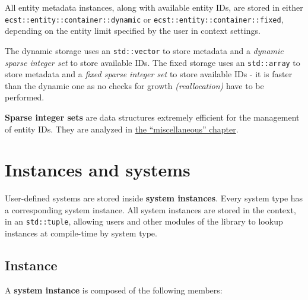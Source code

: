 \documentclass[twoside, 12pt, a4paper, openany]{book}
\begin{document}
All entity metadata instances, along with available entity IDs, are
stored in either
\texttt{ecst::entity::container::dynamic}
or
\texttt{ecst::entity::container::fixed},
depending on the entity limit specified by the user in context settings.

The dynamic storage uses an
\texttt{std::vector}
to store metadata and a \emph{dynamic sparse integer set} to store
available IDs. The fixed storage uses an
\texttt{std::array}
to store metadata and a \emph{fixed sparse integer set} to store
available IDs - it is faster than the dynamic one as no checks for
growth \emph{(reallocation)} have to be performed.

\textbf{Sparse integer sets} are data structures extremely efficient for
the management of entity IDs. They are analyzed in
\protect\hyperlink{appendix_sparse_integer_sets}{the ``miscellaneous''
chapter}.

\hypertarget{storage_system}{\section{Instances and
systems}\label{storage_system}}

User-defined systems are stored inside \textbf{system instances}. Every
system type has a corresponding system instance. All system instances
are stored in the context, in an
\texttt{std::tuple},
allowing users and other modules of the library to lookup instances at
compile-time by system type.

\subsection{Instance}\label{instance}

A \textbf{system instance} is composed of the following members:
\end{document}
